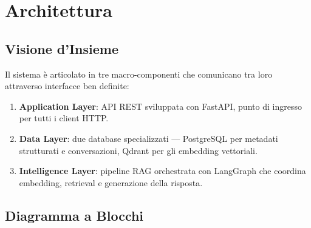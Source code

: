 \chapter{Architettura}

\section{Visione d'Insieme}

Il sistema è articolato in tre macro-componenti che comunicano tra loro attraverso
interfacce ben definite:

\begin{enumerate}
  \item \textbf{Application Layer}: API REST sviluppata con FastAPI, punto di ingresso
        per tutti i client HTTP.
  \item \textbf{Data Layer}: due database specializzati — PostgreSQL per metadati
        strutturati e conversazioni, Qdrant per gli embedding vettoriali.
  \item \textbf{Intelligence Layer}: pipeline RAG orchestrata con LangGraph che
        coordina embedding, retrieval e generazione della risposta.
\end{enumerate}

\section{Diagramma a Blocchi}

